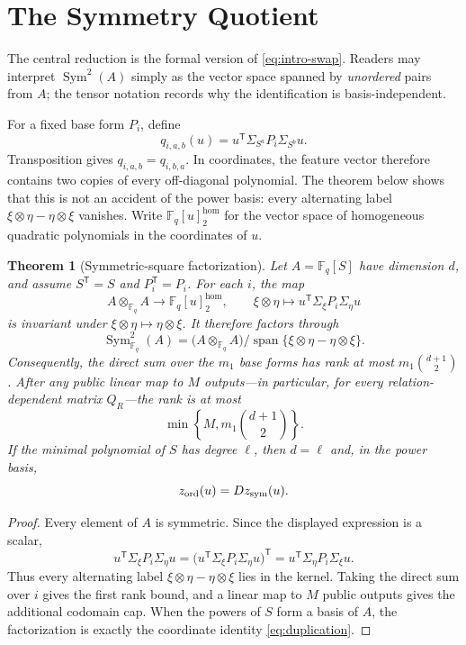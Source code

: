 \documentclass[11pt]{article}
\newtheorem{theorem}{Theorem}
\newcommand{\F}{\mathbb F}
\newcommand{\Sym}{\operatorname{Sym}}
\newcommand{\Span}{\operatorname{span}}
\newcommand{\transpose}{\mathsf T}
\begin{document}
\section{The Symmetry Quotient}\label{sec:symmetry}

The central reduction is the formal version of
\eqref{eq:intro-swap}.  Readers may interpret $\Sym^2(A)$ simply as the vector
space spanned by \emph{unordered} pairs from $A$; the tensor notation records
why the identification is basis-independent.

For a fixed base form $P_i$, define
\[
  q_{i,a,b}(u)=u^\transpose\Sigma_{S^a}P_i\Sigma_{S^b}u.
\]
Transposition gives $q_{i,a,b}=q_{i,b,a}$.  In coordinates, the feature vector
therefore contains two copies of every off-diagonal polynomial.  The theorem
below shows that this is not an accident of the power basis: every alternating
label $\xi\otimes\eta-\eta\otimes\xi$ vanishes.  Write
$\F_q[u]^{\mathrm{hom}}_2$ for the vector space of homogeneous quadratic
polynomials in the coordinates of $u$.

\begin{theorem}[Symmetric-square factorization]\label{thm:symmetric-square}
Let $A=\F_q[S]$ have dimension $d$, and assume $S^\transpose=S$ and
$P_i^\transpose=P_i$.  For each $i$, the map
\[
 A\otimes_{\F_q}A\longrightarrow \F_q[u]^{\mathrm{hom}}_2,
 \qquad
 \xi\otimes\eta\longmapsto
 u^\transpose\Sigma_\xi P_i\Sigma_\eta u
\]
is invariant under $\xi\otimes\eta\mapsto\eta\otimes\xi$.  It therefore
factors through
\[
 \Sym^2_{\F_q}(A)
 =\bigl(A\otimes_{\F_q}A\bigr)
   \big/\Span\{\xi\otimes\eta-\eta\otimes\xi\}.
\]
Consequently, the direct sum over the $m_1$ base forms has rank at most
$m_1\binom{d+1}{2}$.  After any public linear map to $M$ outputs---in
particular, for every relation-dependent matrix $Q_R$---the rank is at most
\begin{equation}\label{eq:symmetry-rank}
 \min\left\{M,m_1\binom{d+1}{2}\right\}.
\end{equation}
If the minimal polynomial of $S$ has degree $\ell$, then $d=\ell$ and, in the
power basis,
\begin{equation}\label{eq:duplication}
 z_{\rm ord}(u)=Dz_{\rm sym}(u).
\end{equation}
\end{theorem}

\begin{proof}
Every element of $A$ is symmetric.  Since the displayed expression is a
scalar,
\[
 u^\transpose\Sigma_\xi P_i\Sigma_\eta u
 =\bigl(u^\transpose\Sigma_\xi P_i\Sigma_\eta u\bigr)^\transpose
 =u^\transpose\Sigma_\eta P_i\Sigma_\xi u.
\]
Thus every alternating label $\xi\otimes\eta-\eta\otimes\xi$ lies in the
kernel.  Taking the direct sum over $i$ gives the first rank bound, and a
linear map to $M$ public outputs gives the additional codomain cap.  When the
powers of $S$ form a basis of $A$, the factorization is exactly the coordinate
identity \eqref{eq:duplication}.
\end{proof}
\end{document}
